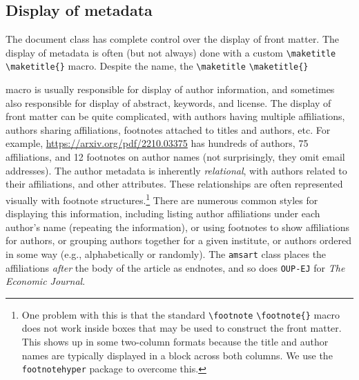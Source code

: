 \documentclass{article}
\newcommand{\cmd}[2][]{%
  \def\FirstArg{#1}%
  \ifx\FirstArg\empty%
    \texttt{\textbackslash{}#2}%
  \else%
    \texttt{\textbackslash{}#2\{#1\}}%
  \fi
}
\newcommand{\pkg}[1]{\texttt{#1}}
\begin{document}
\subsection{Display of metadata}\label{maketitle}
The document class has complete control over the display of front matter.
The display of metadata is often (but not always) done with
a custom \cmd{maketitle} macro. Despite the name, the \cmd{maketitle}
macro is usually responsible for display of author information, and
sometimes also responsible for display of abstract, keywords, and
license. The display of front matter can be quite complicated, with
authors having multiple affiliations, authors sharing affiliations,
footnotes attached to titles and authors, etc. For
example, \url{https://arxiv.org/pdf/2210.03375} has hundreds of
authors, 75 affiliations, and 12 footnotes on author names (not
surprisingly, they omit email addresses).  The author metadata is
inherently {\em relational}, with authors related to their
affiliations, and other attributes. These relationships are often
represented visually with footnote structures.\footnote{One problem
with this is that the standard
\cmd{footnote} macro does not work inside boxes that may be used to construct
the front matter. This shows up in some two-column formats because the
title and author names are typically displayed in a block across both columns.
We use the \texttt{footnotehyper} package to overcome this.}
There are numerous common styles
for displaying this information, including listing author affiliations
under each author's name (repeating the information), or using
footnotes to show affiliations for authors, or grouping authors
together for a given institute, or authors ordered in some way (e.g.,
alphabetically or randomly). The \pkg{amsart} class places the
affiliations {\em after} the body of the article as endnotes, and so
does \pkg{OUP-EJ} for \emph{The Economic Journal}.
\end{document}
